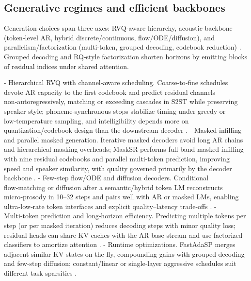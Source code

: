 \subsection{Generative regimes and efficient backbones} \label{subsec:Generative regimes and efficient backbones}
Generation choices span three axes: RVQ‑aware hierarchy, acoustic backbone (token‑level AR, hybrid discrete/continuous, flow/ODE/diffusion), and parallelism/factorization (multi‑token, grouped decoding, codebook reduction) \cite{ji2025languagecodecbridgingdiscreterepresentat,verma2024whispergpthybridrepresentationaudiolarge,li2024investigatingneuralaudiocodecsspeechlang,wang2024c3llmconditionalmultimodalcontentgenerat}. Grouped decoding and RQ‑style factorization shorten horizons by emitting blocks of residual indices under shared attention.

- Hierarchical RVQ with channel‑aware scheduling. Coarse‑to‑fine schedules devote AR capacity to the first codebook and predict residual channels non‑autoregressively, matching or exceeding cascades in S2ST while preserving speaker style; phoneme‑synchronous stops stabilize timing under greedy or low‑temperature sampling, and intelligibility depends more on quantization/codebook design than the downstream decoder \cite{peng2024mslms2stmultitaskspeechlanguagemodeltext,song2024ellavstableneuralcodeclanguagemodelingal,li2024investigatingneuralaudiocodecsspeechlang}.
- Masked infilling and parallel masked generation. Iterative masked decoders avoid long AR chains and hierarchical masking overheads; MaskSR performs full‑band masked infilling with nine residual codebooks and parallel multi‑token prediction, improving speed and speaker similarity, with quality governed primarily by the decoder backbone \cite{li2024masksrmaskedlanguagemodelfullbandspeechr,li2024investigatingneuralaudiocodecsspeechlang}.
- Few‑step flow/ODE and diffusion decoders. Conditional flow‑matching or diffusion after a semantic/hybrid token LM reconstructs micro‑prosody in 10–32 steps and pairs well with AR or masked LMs, enabling ultra‑low‑rate token interfaces and explicit quality–latency trade‑offs \cite{wang2025tadicodectextawarediffusionspeechtokeniz,li2024investigatingneuralaudiocodecsspeechlang}.
- Multi‑token prediction and long‑horizon efficiency. Predicting multiple tokens per step (or per masked iteration) reduces decoding steps with minor quality loss; residual heads can share KV caches with the AR base stream and use factorized classifiers to amortize attention \cite{li2024masksrmaskedlanguagemodelfullbandspeechr}.
- Runtime optimizations. FastAdaSP merges adjacent‑similar KV states on the fly, compounding gains with grouped decoding and few‑step diffusion; constant/linear or single‑layer aggressive schedules suit different task sparsities \cite{lu2024fastadaspmultitaskadaptedefficientinfere}.

